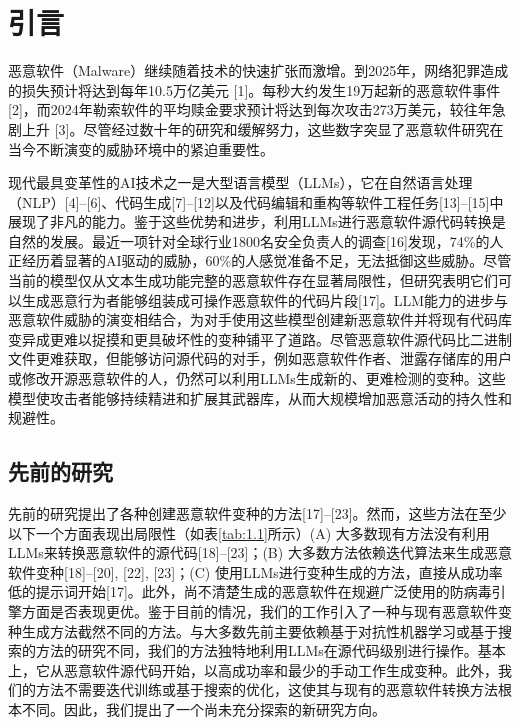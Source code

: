 
\chapter{引言}
恶意软件（Malware）继续随着技术的快速扩张而激增。到2025年，网络犯罪造成的损失预计将达到每年10.5万亿美元 [1]。每秒大约发生19万起新的恶意软件事件 [2]，而2024年勒索软件的平均赎金要求预计将达到每次攻击273万美元，较往年急剧上升 [3]。尽管经过数十年的研究和缓解努力，这些数字突显了恶意软件研究在当今不断演变的威胁环境中的紧迫重要性。

现代最具变革性的AI技术之一是大型语言模型（LLMs），它在自然语言处理（NLP）[4]–[6]、代码生成[7]–[12]以及代码编辑和重构等软件工程任务[13]–[15]中展现了非凡的能力。鉴于这些优势和进步，利用LLMs进行恶意软件源代码转换是自然的发展。最近一项针对全球行业1800名安全负责人的调查[16]发现，74\%的人正经历着显著的AI驱动的威胁，60\%的人感觉准备不足，无法抵御这些威胁。尽管当前的模型仅从文本生成功能完整的恶意软件存在显著局限性，但研究表明它们可以生成恶意行为者能够组装成可操作恶意软件的代码片段[17]。LLM能力的进步与恶意软件威胁的演变相结合，为对手使用这些模型创建新恶意软件并将现有代码库变异成更难以捉摸和更具破坏性的变种铺平了道路。尽管恶意软件源代码比二进制文件更难获取，但能够访问源代码的对手，例如恶意软件作者、泄露存储库的用户或修改开源恶意软件的人，仍然可以利用LLMs生成新的、更难检测的变种。这些模型使攻击者能够持续精进和扩展其武器库，从而大规模增加恶意活动的持久性和规避性。

\section{先前的研究}
先前的研究提出了各种创建恶意软件变种的方法[17]–[23]。然而，这些方法在至少以下一个方面表现出局限性（如表\ref{tab:1.1}所示）(A) 大多数现有方法没有利用LLMs来转换恶意软件的源代码[18]–[23]；(B) 大多数方法依赖迭代算法来生成恶意软件变种[18]–[20], [22], [23]；(C) 使用LLMs进行变种生成的方法，直接从成功率低的提示词开始[17]。此外，尚不清楚生成的恶意软件在规避广泛使用的防病毒引擎方面是否表现更优。鉴于目前的情况，我们的工作引入了一种与现有恶意软件变种生成方法截然不同的方法。与大多数先前主要依赖基于对抗性机器学习或基于搜索的方法的研究不同，我们的方法独特地利用LLMs在源代码级别进行操作。基本上，它从恶意软件源代码开始，以高成功率和最少的手动工作生成变种。此外，我们的方法不需要迭代训练或基于搜索的优化，这使其与现有的恶意软件转换方法根本不同。因此，我们提出了一个尚未充分探索的新研究方向。

